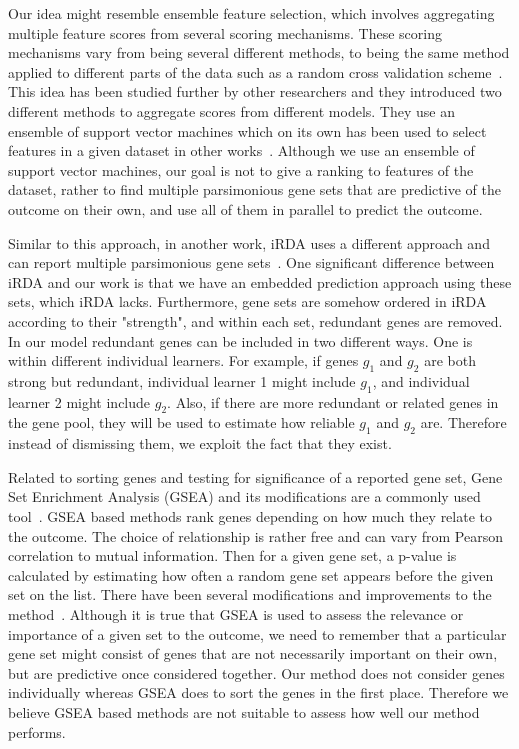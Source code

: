 Our idea might resemble ensemble feature selection, which involves
aggregating multiple feature scores from several scoring
mechanisms. These scoring mechanisms vary from being several different
methods, to being the same method applied to different parts of the data such as a random cross validation scheme~\cite{saeys2008robust}. This idea has been studied further by other researchers and they introduced two different methods to aggregate scores from different models. They use an ensemble of support vector machines which on its own has been used to select features in a given dataset in other works~\cite{guyon2002gene}. Although we use an ensemble of support vector machines, our goal is not to give a ranking to features of the dataset, rather to find multiple parsimonious gene sets that are predictive of the outcome on their own, and use all of them in parallel to predict the outcome. 

Similar to this approach, in another work, iRDA uses a different approach and can report multiple parsimonious gene sets~\cite{lai2015irda}. One significant difference between iRDA and our work is that we have an embedded prediction approach using these sets, which iRDA lacks. Furthermore, gene sets are somehow ordered in iRDA according to their "strength", and within each set, redundant genes are removed. In our model redundant genes can be included in two different ways. One is within different individual learners. For example, if genes $g_1$ and $g_2$ are both strong but redundant, individual learner 1 might include $g_1$, and individual learner 2 might include $g_2$. Also, if there are more redundant or related genes in the gene pool, they will be used to estimate how reliable $g_1$ and $g_2$ are. Therefore instead of dismissing them, we exploit the fact that they exist. 

Related to sorting genes and testing for significance of a reported gene set, Gene Set Enrichment Analysis (GSEA) and its modifications are a commonly used tool~\cite{shi2007gene, subramanian2005gene}. GSEA based methods rank genes depending on how much they relate to the outcome. The choice of relationship is rather free and can vary from Pearson correlation to mutual information. Then for a given gene set, a p-value is calculated by estimating how often a random gene set appears before the given set on the list. There have been several modifications and improvements to the method~\cite{nam2008gene, dopazo2006functional}. Although it is true that GSEA is used to assess the relevance or importance of a given set to the outcome, we need to remember that a particular gene set might consist of genes that are not necessarily important on their own, but are predictive once considered together. Our method does not consider genes individually whereas GSEA does to sort the genes in the first place. Therefore we believe GSEA based methods are not suitable to assess how well our method performs.

